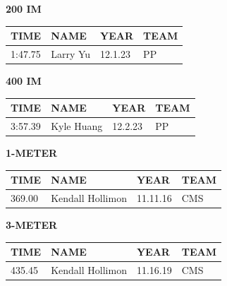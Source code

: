 \begin{table}[H]
\centering
\begin{minipage}[t]{0.48\textwidth}
\centering
\textbf{200 IM}\\[0.1cm]
\begin{tabular}{@{}p{1.8cm}p{2.8cm}p{1.2cm}p{1.4cm}@{}}
\hline
    \textbf{TIME} & \textbf{NAME} & \textbf{YEAR} & \textbf{TEAM} \\
\hline
    1:47.75 & Larry Yu & 12.1.23 & PP \\
\hline
\end{tabular}
\end{minipage}\hfill
\begin{minipage}[t]{0.48\textwidth}
\centering
\textbf{400 IM}\\[0.1cm]
\begin{tabular}{@{}p{1.8cm}p{2.8cm}p{1.2cm}p{1.4cm}@{}}
\hline
    \textbf{TIME} & \textbf{NAME} & \textbf{YEAR} & \textbf{TEAM} \\
\hline
    3:57.39 & Kyle Huang & 12.2.23 & PP \\
\hline
\end{tabular}
\end{minipage}
\end{table}

\begin{table}[H]
\centering
\begin{minipage}[t]{0.6\textwidth}
\centering
\textbf{1-METER}\\[0.1cm]
\begin{tabular}{@{}p{1.8cm}p{2.8cm}p{1.2cm}p{1.4cm}@{}}
\hline
    \textbf{TIME} & \textbf{NAME} & \textbf{YEAR} & \textbf{TEAM} \\
\hline
    369.00 & Kendall Hollimon & 11.11.16 & CMS \\
\hline
\end{tabular}
\end{minipage}
\end{table}

\begin{table}[H]
\centering
\begin{minipage}[t]{0.6\textwidth}
\centering
\textbf{3-METER}\\[0.1cm]
\begin{tabular}{@{}p{1.8cm}p{2.8cm}p{1.2cm}p{1.4cm}@{}}
\hline
    \textbf{TIME} & \textbf{NAME} & \textbf{YEAR} & \textbf{TEAM} \\
\hline
    435.45 & Kendall Hollimon & 11.16.19 & CMS \\
\hline
\end{tabular}
\end{minipage}
\end{table}

